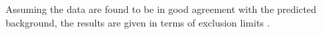 Assuming the data are found to be in good agreement with the predicted background, the results 
are given in terms of exclusion limits \cite{CLs_2002}. 





